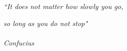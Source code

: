 \thispagestyle{empty}
\vspace*{\fill}
\begin{flushright}

\textit{ “It does not matter how slowly you go,}

\textit{ so long as you do not stop" }

\paragraph{}
\textit{Confucius}
\end{flushright}



